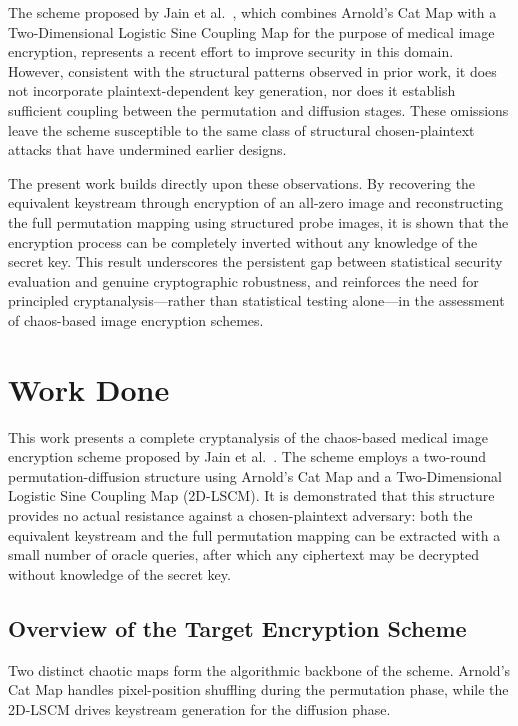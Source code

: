 The scheme proposed by Jain et al.~\cite{jain2021medical}, which combines Arnold's Cat Map with a Two-Dimensional Logistic Sine Coupling Map for the purpose of medical image encryption, represents a recent effort to improve security in this domain. However, consistent with the structural patterns observed in prior work, it does not incorporate plaintext-dependent key generation, nor does it establish sufficient coupling between the permutation and diffusion stages. These omissions leave the scheme susceptible to the same class of structural chosen-plaintext attacks that have undermined earlier designs.

The present work builds directly upon these observations. By recovering the equivalent keystream through encryption of an all-zero image and reconstructing the full permutation mapping using structured probe images, it is shown that the encryption process can be completely inverted without any knowledge of the secret key. This result underscores the persistent gap between statistical security evaluation and genuine cryptographic robustness, and reinforces the need for principled cryptanalysis---rather than statistical testing alone---in the assessment of chaos-based image encryption schemes.
\section{Work Done}

This work presents a complete cryptanalysis of the chaos-based medical image encryption scheme proposed by Jain et al.~\cite{jain2021medical}. The scheme employs a two-round permutation-diffusion structure using Arnold's Cat Map and a Two-Dimensional Logistic Sine Coupling Map (2D-LSCM). It is demonstrated that this structure provides no actual resistance against a chosen-plaintext adversary: both the equivalent keystream and the full permutation mapping can be extracted with a small number of oracle queries, after which any ciphertext may be decrypted without knowledge of the secret key.

\subsection{Overview of the Target Encryption Scheme}

Two distinct chaotic maps form the algorithmic backbone of the scheme. Arnold's Cat Map handles pixel-position shuffling during the permutation phase, while the 2D-LSCM drives keystream generation for the diffusion phase.


